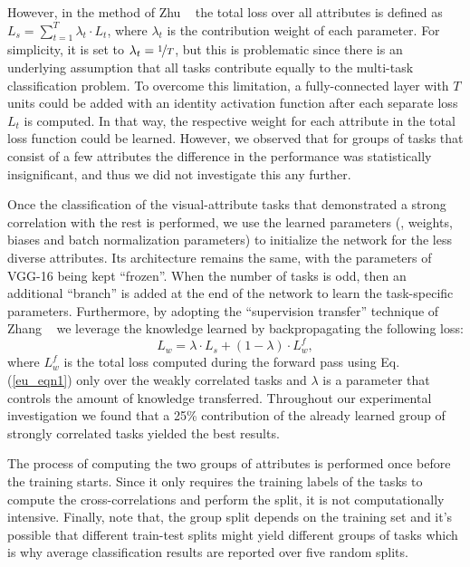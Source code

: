 \documentclass[10pt,twocolumn,letterpaper]{article}
\begin{document}
	However, in the method of Zhu \etal~\cite{zhu2016multi} the total loss over all attributes is defined as \(L_s = \sum_{t=1}^{T}\lambda_t \cdot L_t\), where \(\lambda_t\) is the contribution weight of each parameter. For simplicity, it is set to \(\lambda_t = \nicefrac{1}{T}\), but this is problematic since there is an underlying assumption that all tasks contribute equally to the multi-task classification problem. To overcome this limitation, a fully-connected layer with \(T\) units could be added with an identity activation function after each separate loss \(L_t\) is computed. In that way, the respective weight for each attribute in the total loss function could be learned. However, we observed that for groups of tasks that consist of a few attributes the difference in the performance was statistically insignificant, and thus we did not investigate this any further. 
		
	Once the classification of the visual-attribute tasks that demonstrated a strong correlation with the rest is performed, we use the learned parameters (\ie, weights, biases and batch normalization parameters) to initialize the network for the less diverse attributes. Its architecture remains the same, with the parameters of VGG-16 being kept ``frozen''. When the number of tasks is odd, then an additional ``branch'' is added at the end of the network to learn the task-specific parameters. Furthermore, by adopting the ``supervision transfer'' technique of Zhang \etal~\cite{zhang2016real} we leverage the knowledge learned by backpropagating the following loss: 
	\begin{equation} \label{eu_eqn3}
	L_w = \lambda\cdot L_s + (1-\lambda)\cdot L_w^f,
	\end{equation}
	where \(L_w^f\) is the total loss computed during the forward pass using Eq. (\ref{eu_eqn1}) only over the weakly correlated tasks and \(\lambda\) is a parameter that controls the amount of knowledge transferred. Throughout our experimental investigation we found that a 25\% contribution of the already learned group of strongly correlated tasks yielded the best results. 
	
	The process of computing the two groups of attributes is performed once before the training starts. Since it only requires the training labels of the tasks to compute the cross-correlations and perform the split, it is not computationally intensive. Finally, note that, the group split depends on the training set and it's possible that different train-test splits might yield different groups of tasks which is why average classification results are reported over five random splits. 
	
\end{document}
